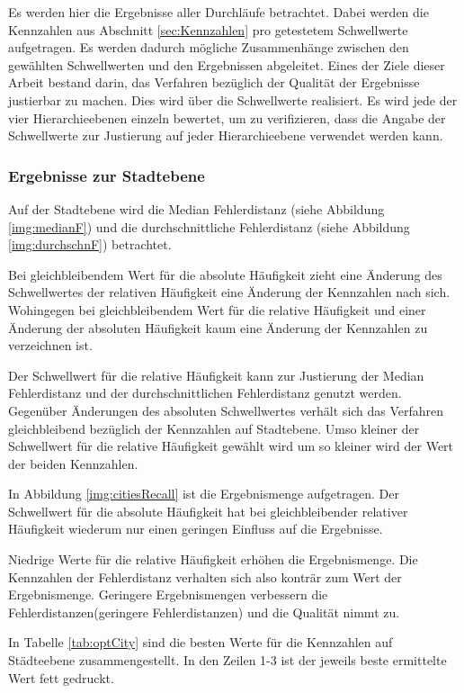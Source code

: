 			Es werden hier die Ergebnisse aller Durchläufe betrachtet.
			Dabei werden die Kennzahlen aus Abschnitt \ref{sec:Kennzahlen} pro getestetem Schwellwerte aufgetragen. 
			Es werden dadurch mögliche Zusammenhänge zwischen den gewählten Schwellwerten und den Ergebnissen abgeleitet.
			Eines der Ziele dieser Arbeit bestand darin, das Verfahren bezüglich der Qualität der Ergebnisse justierbar zu machen.
			Dies wird über die Schwellwerte realisiert.
			Es wird jede der vier Hierarchieebenen einzeln bewertet, um zu verifizieren, dass die Angabe der Schwellwerte zur Justierung auf jeder Hierarchieebene verwendet werden kann.

			\subsubsection{Ergebnisse zur Stadtebene}

				Auf der Stadtebene wird die Median Fehlerdistanz (siehe Abbildung \ref{img:medianF}) und die durchschnittliche Fehlerdistanz (siehe Abbildung \ref{img:durchschnF}) betrachtet.

				Bei gleichbleibendem Wert für die absolute Häufigkeit zieht eine Änderung des Schwellwertes der relativen Häufigkeit eine Änderung der Kennzahlen nach sich. 
				Wohingegen bei gleichbleibendem Wert für die relative Häufigkeit und einer Änderung der absoluten Häufigkeit kaum eine Änderung der Kennzahlen zu verzeichnen ist.

				Der Schwellwert für die relative Häufigkeit kann zur Justierung der Median Fehlerdistanz und der durchschnittlichen Fehlerdistanz genutzt werden.
				Gegenüber Änderungen des absoluten Schwellwertes verhält sich das Verfahren gleichbleibend bezüglich der Kennzahlen auf Stadtebene.
				Umso kleiner der Schwellwert für die relative Häufigkeit gewählt wird um so kleiner wird der Wert der beiden Kennzahlen.

				In Abbildung \ref{img:citiesRecall} ist die Ergebnismenge aufgetragen.
				Der Schwellwert für die absolute Häufigkeit hat bei gleichbleibender relativer Häufigkeit wiederum nur einen geringen Einfluss auf die Ergebnisse. 

				Niedrige Werte für die relative Häufigkeit erhöhen die Ergebnismenge.
				Die Kennzahlen der Fehlerdistanz verhalten sich also konträr zum Wert der Ergebnismenge.
				Geringere Ergebnismengen verbessern die Fehlerdistanzen(geringere Fehlerdistanzen) und die Qualität nimmt zu.		

				In Tabelle \ref{tab:optCity} sind die besten Werte für die Kennzahlen auf Städteebene zusammengestellt. 
				In den Zeilen 1-3 ist der jeweils beste ermittelte Wert fett gedruckt.
				
